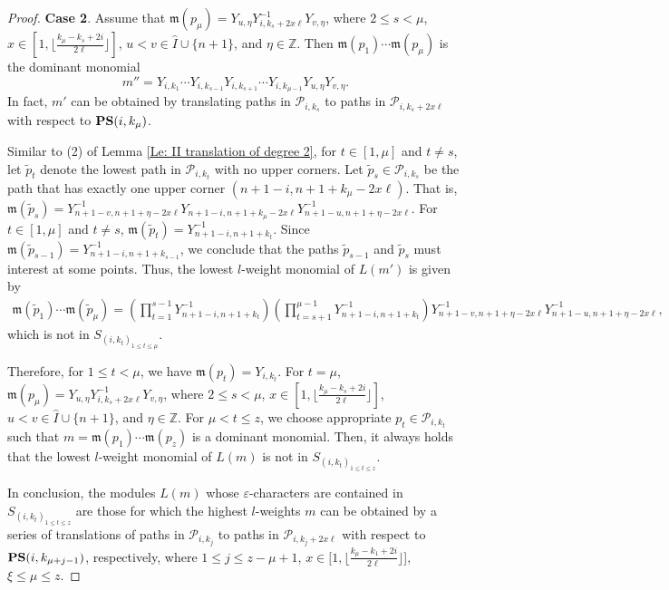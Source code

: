 \documentclass[12pt, reqno]{amsart}
\numberwithin{equation}{section}
\begin{document}
{\begin{proof}
{\bf Case 2}. Assume that $\mathfrak{m}(p_{\mu})=Y_{u,\eta}Y_{i,k_s+2x \ell}^{-1}Y_{v,\eta}$, where $2\leq s<\mu$, $x\in[1,\lfloor\frac{k_\mu-k_s+2i}{2 \ell}\rfloor]$, $u<v \in \hat{I} \cup \{n+1\}$, and $\eta\in \mathbb{Z}$. Then $\mathfrak{m}(p_1)\cdots \mathfrak{m}(p_{\mu})$ is the dominant monomial
\[
m''=Y_{i,k_{1}}\cdots Y_{i,k_{s-1}}Y_{i,k_{s+1}}\cdots Y_{i,k_{\mu-1}} Y_{u,\eta}Y_{v,\eta}.
\]
In fact, $m'$ can be obtained by translating paths in $\mathscr{P}_{i,k_s}$ to paths in $\mathscr{P}_{i,k_s+2x \ell}$ with respect to ${\bf PS}(i,k_{\mu})$.


Similar to (2) of Lemma \ref{Le: II translation of degree 2}, for $t\in [1,\mu]$ and $t\neq s$, let $\widetilde{p}_t$ denote the lowest path in $\mathscr{P}_{i,k_t}$ with no upper corners. Let $\widetilde{p}_{s}\in \mathscr{P}_{i,k_{s}}$ be the path that has exactly one upper corner $(n+1-i,n+1+k_{\mu}-2x\ell)$. That is, $\mathfrak{m}(\widetilde{p}_{s})= Y_{n+1-v,n+1+\eta-2x \ell}^{-1}Y_{n+1-i,n+1+k_\mu -2x \ell} Y_{n+1-u,n+1+\eta-2x \ell}^{-1}$. For $t\in[1, \mu]$ and $t\neq s$, $\mathfrak{m}(\widetilde{p}_{t})=Y_{n+1-i,n+1+k_t}^{-1}$. Since $\mathfrak{m}(\widetilde{p}_{s-1})=Y_{n+1-i,n+1+k_{s-1}}^{-1}$, we conclude that the paths $\widetilde{p}_{s-1}$ and $\widetilde{p}_{s}$ must interest at some points. Thus, the lowest $l$-weight monomial of $L(m')$ is given by
\begin{align*}
 \mathfrak{m}(\widetilde{p}_{1})\cdots \mathfrak{m}(\widetilde{p}_{\mu})=\left( \prod_{t=1}^{s-1} Y_{n+1-i,n+1+k_{t}}^{-1} \right) \left( \prod_{t=s+1}^{\mu-1}Y_{n+1-i,n+1+k_{t}}^{-1} \right) Y_{n+1-v,n+1+\eta-2x \ell}^{-1} Y_{n+1-u,n+1+\eta-2x \ell}^{-1},
\end{align*}
which is not in $S_{(i,k_t)_{1 \leq t \leq \mu}}$.

Therefore, for $1\leq t<\mu$, we have $\mathfrak{m}(p_t)=Y_{i,k_t}$. For $t=\mu$, $\mathfrak{m}(p_{\mu})=Y_{u,\eta}Y_{i,k_s+2x \ell}^{-1}Y_{v,\eta}$, where $2\leq s<\mu$, $x\in[1,\lfloor\frac{k_\mu-k_s+2i}{2 \ell}\rfloor]$, $u<v \in \hat{I} \cup \{n+1\}$, and $\eta\in \mathbb{Z}$. For $\mu<t\leq z$, we choose appropriate $p_t\in\mathscr{P}_{i,k_t}$ such that $m=\mathfrak{m}(p_1)\cdots \mathfrak{m}(p_z)$ is a dominant monomial. Then, it always holds that the lowest $l$-weight monomial of $L(m)$ is not in $S_{(i,k_t)_{1 \leq t \leq z}}$.

In conclusion, the modules $L(m)$ whose $\varepsilon$-characters are contained in $S_{(i,k_t)_{1 \leq t \leq z}}$ are those for which the highest $l$-weights $m$ can be obtained by a series of translations of paths in $\mathscr{P}_{i,k_j}$ to paths in $\mathscr{P}_{i,k_j+2x \ell}$ with respect to ${\bf PS}(i,k_{\mu+j-1})$, respectively, where $1\leq j\leq z-\mu+1$, $x\in [1,\lfloor\frac{k_\mu-k_1+2i}{2 \ell}\rfloor$], $\xi \leq \mu\leq z$.


\end{proof}}
\end{document}
